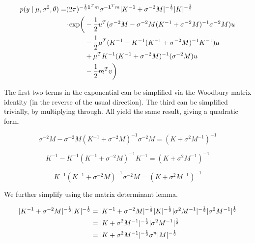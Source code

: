 \documentclass{article}
\newcommand{\one}{\mathbf{1}}
\DeclarePairedDelimiter{\Det}{\lvert}{\rvert}
\begin{document}
\begin{equation}
    \begin{aligned}
        p(y \mid \mu, \sigma^2, \theta)
        = &
        (2 \pi)^{-\frac{1}{2} \one^T m}
        \sigma^{-\one^T m}
        \Det{K^{-1} + \sigma^{-2} M}^{-\frac{1}{2}}
        \Det{K}^{-\frac{1}{2}}
        \\ &
        \begin{aligned}
            \cdot \exp \biggl(
                &
                - \frac{1}{2} u^T (\sigma^{-2} M - \sigma^{-2} M (K^{-1} + \sigma^{-2} M)^{-1} \sigma^{-2} M) u
                \\ &
                - \frac{1}{2} \mu^T (K^{-1} - K^{-1} (K^{-1} + \sigma^{-2} M)^{-1} K^{-1}) \mu
                \\ &
                + \mu^T K^{-1} (K^{-1} + \sigma^{-2} M)^{-1} (\sigma^{-2} M) u
                \\ &
                - \frac{1}{2} m^T v 
            \biggr)
        \end{aligned}
    \end{aligned}
\end{equation}

The first two terms in the exponential can be simplified via the Woodbury matrix identity (in the reverse of the usual direction).
The third can be simplified trivially, by multiplying through.
All yield the same result, giving a quadratic form.

\begin{equation}
    \sigma^{-2} M - \sigma^{-2} M (K^{-1} + \sigma^{-2} M)^{-1} \sigma^{-2} M = (K + \sigma^2 M^{-1})^{-1}
\end{equation}

\begin{equation}
    K^{-1} - K^{-1} (K^{-1} + \sigma^{-2} M)^{-1} K^{-1} = (K + \sigma^2 M^{-1})^{-1}
\end{equation}

\begin{equation}
    K^{-1} (K^{-1} + \sigma^{-2} M)^{-1} \sigma^{-2} M = (K + \sigma^2 M^{-1})^{-1}
\end{equation}

We further simplify using the matrix determinant lemma.

\begin{align}
    \Det{K^{-1} + \sigma^{-2} M}^{-\frac{1}{2}} \Det{K}^{-\frac{1}{2}}
    & =
    \Det{K^{-1} + \sigma^{-2} M}^{-\frac{1}{2}} \Det{K}^{-\frac{1}{2}}
    \Det{\sigma^2 M^{-1}}^{-\frac{1}{2}} \Det{\sigma^2 M^{-1}}^{\frac{1}{2}}
    \\ &=
    \Det{K + \sigma^2 M^{-1}}^{-\frac{1}{2}}
    \Det{\sigma^2 M^{-1}}^{\frac{1}{2}}
    \\ &=
    \Det{K + \sigma^2 M^{-1}}^{-\frac{1}{2}}
    \sigma^n
    \Det{M}^{-\frac{1}{2}}
\end{align}
\end{document}
